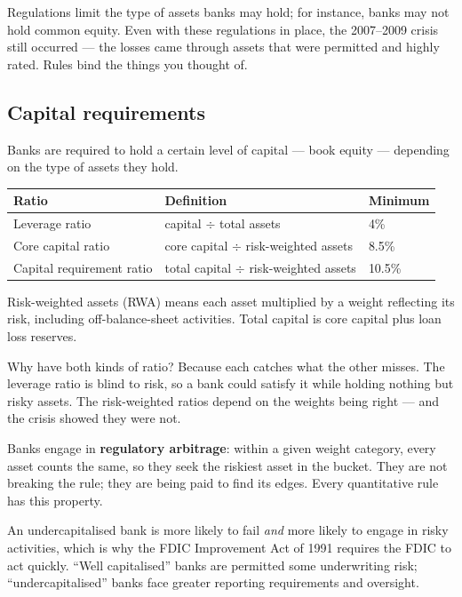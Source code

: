 \documentclass[11pt,a4paper]{article}
\begin{document}
Regulations limit the type of assets banks may hold; for instance, banks may not
hold common equity. Even with these regulations in place, the 2007--2009 crisis
still occurred --- the losses came through assets that were permitted and highly
rated. Rules bind the things you thought of.

\subsection*{Capital requirements}

Banks are required to hold a certain level of capital --- book equity ---
depending on the type of assets they hold.

\begin{center}
\renewcommand{\arraystretch}{1.3}
\begin{tabular}{@{}lll@{}}
\toprule
{\color{ifteal}\bfseries Ratio} & {\color{ifteal}\bfseries Definition} & {\color{ifteal}\bfseries Minimum}\\
\midrule
Leverage ratio & capital $\div$ total assets & 4\% \\
Core capital ratio & core capital $\div$ risk-weighted assets & 8.5\% \\
Capital requirement ratio & total capital $\div$ risk-weighted assets & 10.5\% \\
\bottomrule
\end{tabular}
\end{center}

Risk-weighted assets (RWA) means each asset multiplied by a weight reflecting
its risk, including off-balance-sheet activities. Total capital is core capital
plus loan loss reserves.

Why have both kinds of ratio? Because each catches what the other misses. The
leverage ratio is blind to risk, so a bank could satisfy it while holding
nothing but risky assets. The risk-weighted ratios depend on the weights being
right --- and the crisis showed they were not.

Banks engage in \textbf{regulatory arbitrage}: within a given weight category,
every asset counts the same, so they seek the riskiest asset in the bucket. They
are not breaking the rule; they are being paid to find its edges. Every
quantitative rule has this property.

An undercapitalised bank is more likely to fail \emph{and} more likely to engage
in risky activities, which is why the FDIC Improvement Act of 1991 requires the
FDIC to act quickly. ``Well capitalised'' banks are permitted some underwriting
risk; ``undercapitalised'' banks face greater reporting requirements and
oversight.
\end{document}
